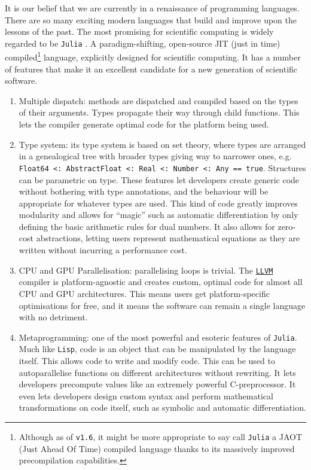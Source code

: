 It is our belief that we are currently in a renaissance of programming languages. There are so many exciting modern languages that build and improve upon the lessons of the past. The most promising for scientific computing is widely regarded to be \texttt{Julia} \cite{julia}. A paradigm-shifting, open-source JIT (just in time) compiled\footnote{Although as of \texttt{v1.6}, it might be more appropriate to say call \texttt{Julia} a JAOT (Just Ahead Of Time) compiled language thanks to its massively improved precompilation capabilities.} language, explicitly designed for scientific computing. It has a number of features that make it an excellent candidate for a new generation of scientific software.
\begin{enumerate}
    \item Multiple dispatch: methods are dispatched and compiled based on the types of their arguments. Types propagate their way through child functions. This lets the compiler generate optimal code for the platform being used.
    \item Type system: its type system is based on set theory, where types are arranged in a genealogical tree with broader types giving way to narrower ones, e.g. \texttt{Float64 <: AbstractFloat <: Real <: Number <: Any == true}. Structures can be parametric on type. These features let developers create generic code without bothering with type annotations, and the behaviour will be appropriate for whatever types are used. This kind of code greatly improves modularity and allows for ``magic'' such as automatic differentiation by only defining the basic arithmetic rules for dual numbers. It also allows for zero-cost abstractions, letting users represent mathematical equations as they are written without incurring a performance cost.
    \item CPU and GPU Parallelisation: parallelising loops is trivial. The \href{https://llvm.org/}{\texttt{LLVM}} compiler is platform-agnostic and creates custom, optimal code for almost all CPU and GPU architectures. This means users get platform-specific optimisations for free, and it means the software can remain a single language with no detriment.
    \item Metaprogramming: one of the most powerful and esoteric features of \texttt{Julia}. Much like \texttt{Lisp}, code is an object that can be manipulated by the language itself. This allows code to write and modify code. This can be used to autoparallelise functions on different architectures without rewriting. It lets developers precompute values like an extremely powerful C-preprocessor. It even lets developers design custom syntax and perform mathematical transformations on code itself, such as symbolic and automatic differentiation.

\end{enumerate}
